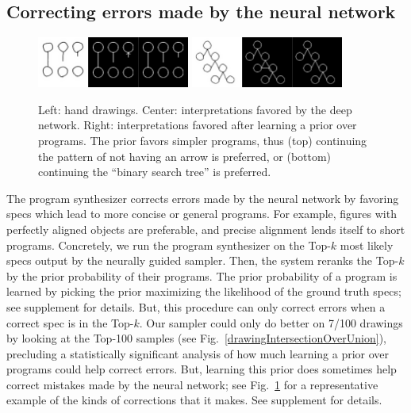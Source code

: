 \documentclass{article}
\theoremstyle{definition}
\begin{document}
\begin{table}[h]
\subsection{Correcting errors made by the neural network}\label{synthesizerHelpsParsing}
\begin{figure}\vspace{-0.5cm}
  \includegraphics[width = 5cm]{figures/programSuccess7.png}
  \includegraphics[width = 5cm]{figures/programSuccess16.png}
  \caption{Left: hand drawings. Center: interpretations favored by the deep network. Right: interpretations favored after learning a prior over programs. The prior favors  simpler programs, thus (top) continuing the pattern of not having an arrow is preferred, or (bottom) continuing the ``binary search tree'' is preferred.}\label{exampleOfProgramCorrectingMistake}
\vspace{-0.75cm}  \end{figure}
The program synthesizer corrects errors made by the neural network by favoring specs which lead to more
concise or general programs.  For example, figures with perfectly aligned objects are preferable, %
and precise alignment lends itself to short
programs.
Concretely,
we run the program synthesizer on the
Top-$k$  most likely specs output by the neurally guided sampler.
Then, the system
reranks the Top-$k$  by  the prior probability of their programs.
The prior probability of a program is learned by picking the prior maximizing
the likelihood of the ground truth specs;
see supplement for details.
But, this procedure can only correct errors when
a correct spec is in the Top-$k$.
Our sampler could only do better on
7/100 drawings by looking at the Top-100 samples
(see Fig.~\ref{drawingIntersectionOverUnion}),
precluding a statistically significant analysis of how much
learning a prior over programs could help correct errors.
But,
learning this prior does sometimes 
help correct mistakes made by the neural network; %
see
Fig.~\ref{exampleOfProgramCorrectingMistake} for a representative
example of the kinds of corrections that it makes.
See supplement for details.




\end{table}
\end{document}
